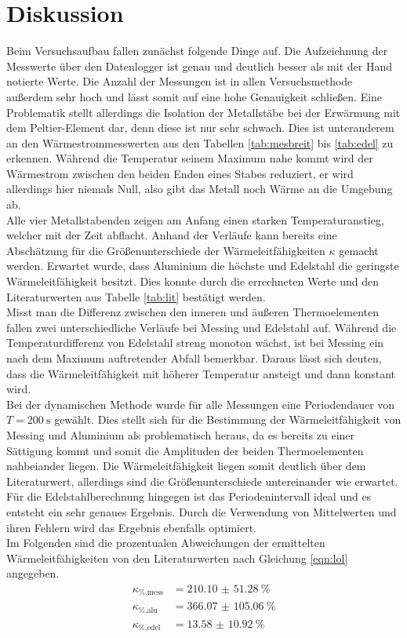 \section{Diskussion}

Beim Versuchsaufbau fallen zunächst folgende Dinge auf. Die Aufzeichnung der Messwerte über den Datenlogger ist genau und deutlich besser als mit der Hand notierte Werte. Die Anzahl der Messungen
ist in allen Versuchsmethode außerdem sehr hoch und lässt somit auf eine hohe Genauigkeit schließen. Eine Problematik stellt allerdings die Isolation der Metallstäbe bei der Erwärmung mit dem Peltier-Element dar, denn
diese ist nur sehr schwach. Dies ist unteranderem an den Wärmestrommesswerten aus den Tabellen \ref{tab:mesbreit} bis \ref{tab:edel} zu erkennen. Während die Temperatur seinem Maximum nahe kommt wird der Wärmestrom zwischen den beiden Enden eines Stabes 
reduziert, er wird allerdings hier niemals Null, also gibt das Metall noch Wärme an die Umgebung ab.
\\
\newline
Alle vier Metallstabenden zeigen am Anfang einen starken Temperaturanstieg, welcher mit der Zeit abflacht. Anhand der Verläufe kann bereits eine Abschätzung für die Größenunterschiede der Wärmeleitfähigkeiten 
$\kappa$ gemacht werden. Erwartet wurde, dass Aluminium die höchste und Edelstahl die geringste Wärmeleitfähigkeit besitzt. Dies konnte durch die errechneten Werte und den Literaturwerten aus Tabelle \ref{tab:lit} bestätigt werden.
\\
Misst man die Differenz zwischen den inneren und äußeren Thermoelementen fallen zwei unterschiedliche Verläufe bei Messing und Edelstahl auf. Während die Temperaturdifferenz von Edelstahl streng monoton wächst, ist bei Messing ein 
nach dem Maximum auftretender Abfall bemerkbar. Daraus lässt sich deuten, dass die Wärmeleitfähigkeit mit höherer Temperatur ansteigt und dann konstant wird.
\\
\newline
Bei der dynamischen Methode wurde für alle Messungen eine Periodendauer von $T = \SI{200}{\second}$ gewählt. Dies stellt sich für die Bestimmung der Wärmeleitfähigkeit von Messing und Aluminium als problematisch heraus, da es bereits
zu einer Sättigung kommt und somit die Amplituden der beiden Thermoelementen nahbeiander liegen. Die Wärmeleitfähigkeit liegen somit deutlich über dem Literaturwert, allerdings sind die Größenunterschiede untereinander wie erwartet.
Für die Edelstahlberechnung hingegen ist das Periodenintervall ideal und es entsteht ein sehr genaues Ergebnis. Durch die Verwendung von Mittelwerten und ihren Fehlern wird das Ergebnis ebenfalls optimiert.
\\
\newline
Im Folgenden sind die prozentualen Abweichungen der ermittelten Wärmeleitfähigkeiten von den Literaturwerten nach Gleichung \ref{eqn:lol} angegeben.
\begin{align}
\kappa_{\si{\percent}\text{,mess}} &=  \SI{210.10(5128)}{\percent} \\ 
\kappa_{\si{\percent}\text{,alu}} &=   \SI{366.07(10506)}{\percent} \\
\kappa_{\si{\percent}\text{,edel}} &= \SI{13.58(1092)}{\percent}
\end{align}